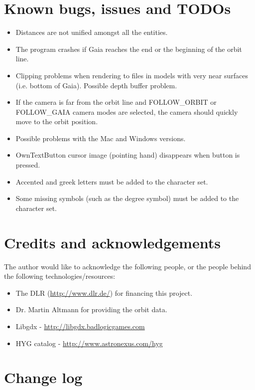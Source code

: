 \documentclass[
a4paper, %
11pt, %
onecolumn, %
openany, %
]{memoir}
\begin{document}
\chapter{Known bugs, issues and TODOs}
\begin{itemize}
\item Distances are not unified amongst all the entities.
\item The program crashes if Gaia reaches the end or the beginning
of the orbit line.
\item Clipping problems when rendering to files in models with very near 
surfaces (i.e. bottom of Gaia). Possible depth buffer problem.
\item If the camera is far from the orbit line and FOLLOW\_ORBIT or 
FOLLOW\_GAIA camera modes are selected, the camera should quickly
move to the orbit position.
\item Possible problems with the Mac and Windows versions.
\item OwnTextButton cursor image (pointing hand) disappears when button is
pressed.
\item Accented and greek letters must be added to the character set.
\item Some missing symbols (such as the degree symbol) must be added
to the character set.
\end{itemize}

\chapter{Credits and acknowledgements}
The author would like to acknowledge the following people, or the
people behind the following technologies/resources:

\begin{itemize}
\item The DLR (\href{http://www.dlr.de/}{http://www.dlr.de/}) for financing this project.
\item Dr. Martin Altmann for providing the orbit data.
\item Libgdx - \href{http://libgdx.badlogicgames.com}{http://libgdx.badlogicgames.com}
\item HYG catalog - \href{http://www.astronexus.com/hyg}{http://www.astronexus.com/hyg}
\end{itemize}

\chapter{Change log}
\end{document}
